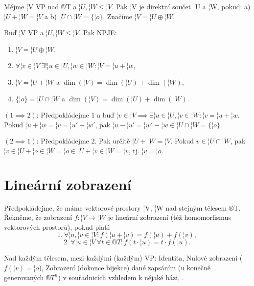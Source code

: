 \documentclass[12pt]{article}					%
\begin{document}
        \begin{definice}
            Mějme ¦V VP nad ®T a $¦U, ¦W ≤ ¦V$. Pak ¦V je direktní součet ¦U a ¦W, pokud: a) $¦U + ¦W = ¦V$ a b) $¦U \cap ¦W = \{¦o\}$. Značíme $¦V = ¦U \oplus ¦W$.
        \end{definice}

        \begin{veta}
            Buď ¦V VP a $¦U, ¦W ≤ ¦V$. Pak NPJE:
            \begin{enumerate}
                \item $¦V = ¦U \oplus ¦W$,
                \item $\forall ¦v \in ¦V\ \exists! ¦u \in ¦U, ¦w \in ¦W: ¦V = ¦u + ¦w$,
                \item $¦V = ¦U + ¦W$ a $\dim(¦V) = \dim(¦U) + \dim(¦W)$,
                \item $\{¦o\} = ¦U \cap ¦W$ a $\dim(¦V) = \dim(¦U) + \dim(¦W)$.
            \end{enumerate}

            \begin{dukazin}
                $(1 \implies 2)$: Předpokládejme 1 a buď $¦v \in ¦V \implies \exists ¦u \in ¦U, ¦v \in ¦W: ¦v = ¦u+¦w$. Pokud $¦u + ¦w = ¦v = ¦u' + ¦w'$, pak $¦u - ¦u' = ¦w' - ¦w \in ¦U \cap ¦W = \{¦o\}$.

                $(2 \implies 1)$: Předpokládejme 2. Pak určitě $¦U + ¦W = ¦V$. Pokud $v \in ¦U \cap ¦W$, pak $¦v \in ¦U + ¦o \in ¦W = ¦o \in ¦U + ¦v \in ¦W = ¦v$, tj. $¦v = ¦o$.
            \end{dukazin}
        \end{veta}

\section{Lineární zobrazení}
    \begin{definice}
        Předpokládejme, že máme vektorové prostory ¦V, ¦W nad stejným tělesem ®T. Řekněme, že zobrazení $f: ¦V \rightarrow ¦W$ je lineární zobrazení (též homomorfismus vektorových prostorů), pokud platí:
        $$ 1.\ \forall ¦u, ¦v \in ¦V: f(¦u + ¦v) = f(¦u) + f(¦v), $$
        $$ 2.\ \forall ¦u \in ¦V\ \forall t \in ®T: f(t·¦u) = t·f(¦u). $$ 
    \end{definice}

    \begin{priklady}
        Nad každým tělesem, mezi každými (každým) VP: Identita, Nulové zobrazení ($f(¦v) = ¦o$), Zobrazení (dokonce bijekce) dané zapsáním (u konečně generovaných $®T^n$) v souřadnicích vzhledem k nějaké bázi, .
    \end{priklady}
\end{document}
